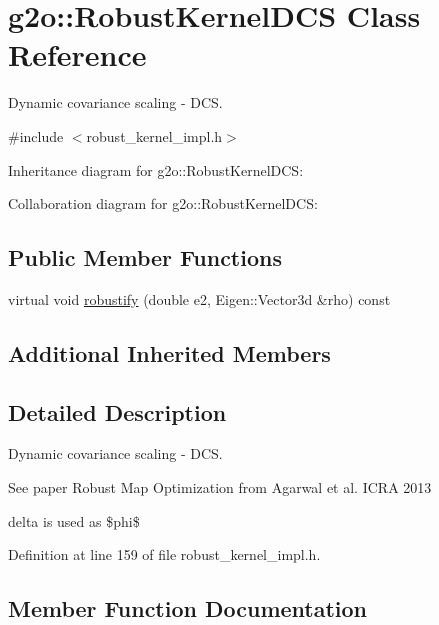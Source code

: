 \hypertarget{classg2o_1_1RobustKernelDCS}{}\section{g2o\+:\+:Robust\+Kernel\+D\+CS Class Reference}
\label{classg2o_1_1RobustKernelDCS}


Dynamic covariance scaling -\/ D\+CS.  




{\ttfamily \#include $<$robust\+\_\+kernel\+\_\+impl.\+h$>$}



Inheritance diagram for g2o\+:\+:Robust\+Kernel\+D\+CS\+:


Collaboration diagram for g2o\+:\+:Robust\+Kernel\+D\+CS\+:
\subsection*{Public Member Functions}
\begin{DoxyCompactItemize}
\item 
virtual void \hyperlink{classg2o_1_1RobustKernelDCS_a4b9b1d991bf3b86093dd4759a032cd78}{robustify} (double e2, Eigen\+::\+Vector3d \&rho) const 
\end{DoxyCompactItemize}
\subsection*{Additional Inherited Members}


\subsection{Detailed Description}
Dynamic covariance scaling -\/ D\+CS. 

See paper Robust Map Optimization from Agarwal et al. I\+C\+RA 2013

delta is used as \$phi\$ 

Definition at line 159 of file robust\+\_\+kernel\+\_\+impl.\+h.



\subsection{Member Function Documentation}
